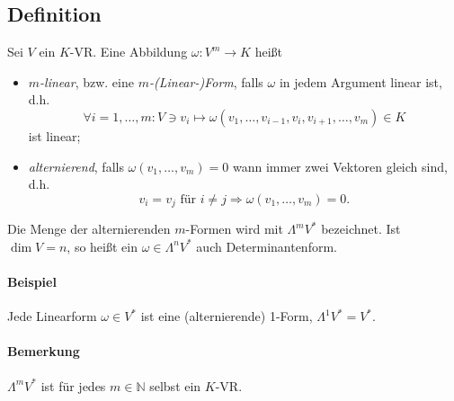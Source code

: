 \subsection{Definition}
	\begin{Definition}
	Sei $ V $ ein $ K $-VR. Eine Abbildung $ \omega:V^m\to K $ heißt
		\begin{itemize}
		\item \emph{$ m $-linear}, bzw. eine \emph{$ m $-(Linear-)Form}, falls $ \omega $ in jedem Argument linear ist, d.h.
			\[ \forall i=1,\dots, m: V\ni v_i\mapsto \omega(v_1,\dots,v_{i-1},v_i,v_{i+1},\dots,v_m)\in K \]
			ist linear;
		\item \emph{alternierend}, falls $ \omega(v_1,\dots,v_m)=0 $ wann immer zwei Vektoren gleich sind, d.h.
			\[ v_i = v_j \text{ für } i\neq j \Rightarrow \omega(v_1,\dots, v_m) = 0. \] 
		\end{itemize}
	Die Menge der alternierenden $ m $-Formen wird mit $ \Lambda^mV^* $ bezeichnet. Ist $ \dim V = n $, so heißt ein $ \omega\in \Lambda^nV^* $ auch Determinantenform.
	\end{Definition}

\paragraph{Beispiel}
	Jede Linearform $ \omega\in V^* $ ist eine (alternierende) 1-Form, $ \Lambda^1V^*=V^* $.
\paragraph{Bemerkung}
	$ \Lambda^mV^* $ ist für jedes $ m\in \mathbb{N} $ selbst ein $ K $-VR. 
